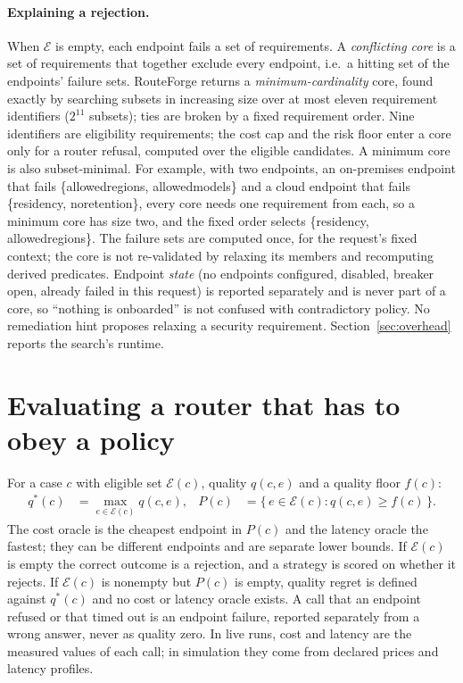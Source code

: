 \documentclass[11pt]{article}
\newcommand{\ubreak}{\textunderscore\allowbreak}
\newcommand{\code}[1]{{\ttfamily\let\_\ubreak #1}}
\newcommand{\E}{\mathcal{E}}
\begin{document}
\paragraph{Explaining a rejection.} When $\E$ is empty, each endpoint fails a set of
requirements. A \emph{conflicting core} is a set of requirements that together exclude every
endpoint, i.e.\ a hitting set of the endpoints' failure sets. RouteForge returns a
\emph{minimum-cardinality} core, found exactly by searching subsets in increasing size over at
most eleven requirement identifiers ($2^{11}$ subsets); ties are broken by a fixed requirement
order. Nine identifiers are eligibility requirements; the cost cap and the risk floor enter a core
only for a router refusal, computed over the eligible candidates. A minimum core is also subset-minimal. For example, with two endpoints, an on-premises
endpoint that fails \{\code{allowed\_regions}, \code{allowed\_models}\} and a cloud endpoint that fails
\{\code{residency}, \code{no\_retention}\}, every core needs one requirement from each, so a
minimum core has size two, and the fixed order selects \{\code{residency},
\code{allowed\_regions}\}. The failure sets are computed once, for the request's fixed context;
the core is not re-validated by relaxing its members and recomputing derived predicates.
Endpoint \emph{state} (no endpoints configured, disabled, breaker open, already failed in this
request) is reported separately and is never part of a core, so ``nothing is onboarded'' is not
confused with contradictory policy. No remediation hint proposes relaxing a security
requirement. Section~\ref{sec:overhead} reports the search's runtime.

\section{Evaluating a router that has to obey a policy}
\label{sec:eval}

For a case $c$ with eligible set $\E(c)$, quality $q(c,e)$ and a quality floor $f(c)$:
\begin{align*}
  q^*(c) &= \max_{e \in \E(c)} q(c,e), &
  P(c) &= \{\, e \in \E(c) : q(c,e) \ge f(c) \,\}.
\end{align*}
The cost oracle is the cheapest endpoint in $P(c)$ and the latency oracle the fastest; they
can be different endpoints and are separate lower bounds. If $\E(c)$ is empty the correct
outcome is a rejection, and a strategy is scored on whether it rejects. If $\E(c)$ is nonempty
but $P(c)$ is empty, quality regret is defined against $q^*(c)$ and no cost or latency oracle
exists. A call that an endpoint refused or that timed out is an endpoint failure, reported
separately from a wrong answer, never as quality zero. In live runs, cost and latency are the
measured values of each call; in simulation they come from declared prices and latency
profiles.
\end{document}

